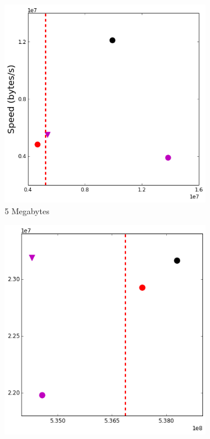 \documentclass{sig-alternate-05-2015}
\begin{document}
\begin{figure}[t]
\centering
	\hspace*{30pt}
	\begin{subfigure}{.24\linewidth}
	\includegraphics[width=\linewidth]{img/speed_bytes/5M.png}
	\caption{5 Megabytes}
	\label{speed_bytes_5M}
	\end{subfigure}
	\begin{subfigure}{.228\linewidth}
	\includegraphics[width=\linewidth]{img/speed_bytes/512M.png}

\end{subfigure}
\end{figure}
\end{document}
